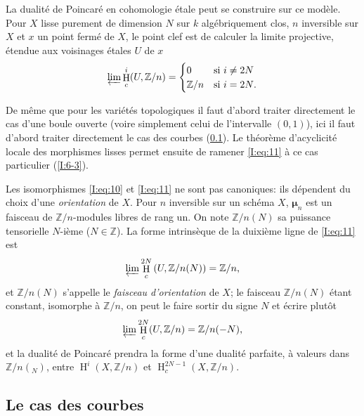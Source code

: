 \documentclass{book}
\DeclareMathOperator{\h}{H}
\newcommand{\dmu}{{\bm\mu}}%
\newcommand{\dZ}{\mathbb{Z}}
\begin{document}
La dualité de Poincaré en cohomologie étale peut se construire sur ce 
modèle. Pour $X$ lisse purement de dimension $N$ sur $k$ algébriquement clos, 
$n$ inversible sur $X$ et $x$ un point fermé de $X$, le point clef est de 
calculer la limite projective, étendue aux voisinages étales $U$ de $x$ 
\begin{equation}\label{I:eq:11}
  \varprojlim \h_c^i(U,\dZ/n) 
    = \begin{cases}
        0     & \text{si $i\ne 2N$} \\
        \dZ/n & \text{si $i=2N$.}
      \end{cases} 
\end{equation}

De même que pour les variétés topologiques il faut d'abord traiter 
directement le cas d'une boule ouverte (voire simplement celui de l'intervalle 
$(0,1)$), ici il faut d'abord traiter directement le cas des courbes 
(\ref{I:6-2}). Le théorème d'acyclicité locale des morphismes lisses 
permet ensuite de ramener \eqref{I:eq:11} à ce cas particulier (\ref{I:6-3}). 

Les isomorphismes \eqref{I:eq:10} et \eqref{I:eq:11} ne sont pas canoniques: 
ils dépendent du choix d'une \emph{orientation} de $X$. Pour $n$ inversible 
sur un schéma $X$, $\dmu_n$ est un faisceau de $\dZ/n$-modules libres de rang 
un. On note $\dZ/n(N)$ sa puissance tensorielle $N$-ième ($N\in\dZ$). La 
forme intrinsèque de la duixième ligne de \eqref{I:eq:11} est 
\begin{equation}\label{I:eq:12}
  \varprojlim \h_c^{2N} \left(U,\dZ/n(N)\right) = \dZ/n \text{,}
\end{equation}
et $\dZ/n(N)$ s'appelle le \emph{faisceau d'orientation} de $X$; le faisceau 
$\dZ/n(N)$ étant constant, isomorphe à $\dZ/n$, on peut le faire sortir 
du signe $N$ et écrire plutôt
\begin{equation}\label{I:eq:13}
  \varprojlim \h_c^{2N} (U,\dZ/n) = \dZ/n(-N) \text{,}
\end{equation}
et la dualité de Poincaré prendra la forme d'une dualité parfaite, à 
valeurs dans $\dZ/n(_N)$, entre $\h^i(X,\dZ/n)$ et $\h_c^{2N-1}(X,\dZ/n)$. 










\subsection{Le cas des courbes}\label{I:6-2}
\end{document}
